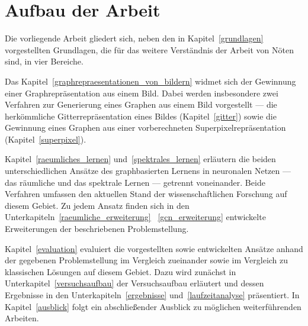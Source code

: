 \section{Aufbau der Arbeit}
\label{aufbau_der_arbeit}

Die vorliegende Arbeit gliedert sich, neben den in Kapitel~\ref{grundlagen} vorgestellten Grundlagen, die für das weitere Verständnis der Arbeit von Nöten sind, in vier Bereiche.

Das Kapitel~\ref{graphrepraesentationen_von_bildern} widmet sich der Gewinnung einer Graphrepräsentation aus einem Bild.
Dabei werden insbesondere zwei Verfahren zur Generierung eines Graphen aus einem Bild vorgestellt — die herkömmliche Gitterrepräsentation eines Bildes (Kapitel~\ref{gitter}) sowie die Gewinnung eines Graphen aus einer vorberechneten Superpixelrepräsentation (Kapitel~\ref{superpixel}).

Kapitel~\ref{raeumliches_lernen} und~\ref{spektrales_lernen} erläutern die beiden unterschiedlichen Ansätze des graphbasierten Lernens in neuronalen Netzen — das räumliche und das spektrale Lernen — getrennt voneinander.
Beide Verfahren umfassen den aktuellen Stand der wissenschaftlichen Forschung auf diesem Gebiet.
Zu jedem Ansatz finden sich in den Unterkapiteln~\ref{raeumliche_erweiterung} \bzw{}~\ref{gcn_erweiterung} entwickelte Erweiterungen \bzgl{} der beschriebenen Problemstellung.

Kapitel~\ref{evaluation} evaluiert die vorgestellten sowie entwickelten Ansätze anhand der gegebenen Problemstellung im Vergleich zueinander sowie im Vergleich zu klassischen Lösungen auf diesem Gebiet.
Dazu wird zunächst in Unterkapitel~\ref{versuchsaufbau} der Versuchsaufbau erläutert und dessen Ergebnisse in den Unterkapiteln~\ref{ergebnisse} und~\ref{laufzeitanalyse} präsentiert.
In Kapitel~\ref{ausblick} folgt ein abschließender Ausblick zu möglichen weiterführenden Arbeiten.
